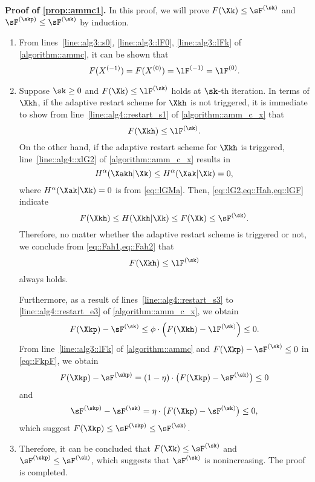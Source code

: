 \noindent\textbf{Proof of \ref{prop::ammc1}.\;} In this proof, we will prove $F(\Xk)\leq \sF^{(\sk)}$ and $\sF^{(\skp)}\leq \sF^{(\sk)}$ by induction.
\begin{enumerate}[leftmargin=0.45cm]%
\item From lines~\ref{line::alg3::s0}, \ref{line::alg3::lF0}, \ref{line::alg3::lFk} of \cref{algorithm::ammc}, it can be shown that
\begin{equation}\label{eq::sF0011}
	F(X^{(-1)})=F(X^{(0)})=\lF^{(-1)}=\lF^{(0)}.
\end{equation}
\item Suppose $\sk\geq 0$ and $F(\Xk)\leq \lF^{(\sk)}$ holds at $\sk$-th iteration. In terms of $\Xkh$, if the adaptive restart scheme for $\Xkh$  is not triggered, it is immediate to show from line~\ref{line::alg4::restart_s1} of \cref{algorithm::amm_c_x} that
\begin{equation}\label{eq::Fah1}
F(\Xkh) \leq \lF^{(\sk)}.
\end{equation}
On the other hand, if the adaptive restart scheme for $\Xkh$ is triggered, line~\ref{line::alg4::xlG2} of \cref{algorithm::amm_c_x} results in
\begin{equation}\label{eq::Hah}
H^\alpha(\Xakh|\Xk) \leq H^\alpha(\Xak|\Xk)= 0,
\end{equation}
where $H^{\alpha}(\Xak|\Xk) = 0$ is from \cref{eq::lGMa}. Then, \cref{eq::lG2,eq::Hah,eq::lGF} indicate
\begin{equation}\label{eq::Fah2}
F(\Xkh)\leq H(\Xkh|\Xk) \leq F(\Xk) \leq \sF^{(\sk)}.
\end{equation}
Therefore, no matter whether the adaptive restart scheme is triggered or not, we conclude from \cref{eq::Fah1,eq::Fah2} that
\begin{equation}\label{eq::Fah}
F(\Xkh) \leq \lF^{(\sk)}
\end{equation}
always holds.

Furthermore, as a result of lines~\ref{line::alg4::restart_s3} to \ref{line::alg4::restart_e3} of \cref{algorithm::amm_c_x}, we obtain
\begin{equation}\label{eq::FkpF}
F(\Xkp)-\sF^{(\sk)} \leq \phi\cdot\Big(F(\Xkh)-\lF^{(\sk)}\Big) \leq 0.
\end{equation}
From line~\ref{line::alg3::lFk} of \cref{algorithm::ammc} and $F(\Xkp)-\sF^{(\sk)} \leq 0$ in \cref{eq::FkpF}, we obtain
\begin{equation}
\nonumber
F(\Xkp)- \sF^{(\skp)} = (1-\eta)\cdot \big(F(\Xkp) - \sF^{(\sk)} \big)\leq 0
\end{equation}
and
\begin{equation}
\nonumber
\sF^{(\skp)}-\sF^{(\sk)} = \eta\cdot \big(F(\Xkp) - \sF^{(\sk)} \big)\leq 0,
\end{equation}
which suggest $F(\Xkp)\leq \sF^{(\skp)}\leq \sF^{(\sk)}$. 
\item Therefore, it can be concluded that $F(\Xk)\leq \sF^{(\sk)}$ and $\sF^{(\skp)}\leq \sF^{(\sk)}$, which suggests that $\sF^{(\sk)}$ is nonincreasing. The proof is completed.
\end{enumerate}

